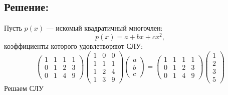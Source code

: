 \documentclass[12pt]{article}
\begin{document}
    \subsection*{Решение:}
    Пусть $p(x)$ --- искомый квадратичный многочлен:
    \[
        p(x) = a + b x + c x^2 ,
    \]
    коэффициенты которого удовлетворяют СЛУ:
    \[
        \begin{pmatrix}
            1 & 1 & 1 & 1 \\
            0 & 1 & 2 & 3 \\
            0 & 1 & 4 & 9
        \end{pmatrix}
        \begin{pmatrix}
            1 & 0 & 0 \\
            1 & 1 & 1 \\
            1 & 2 & 4 \\
            1 & 3 & 9
        \end{pmatrix}
        \begin{pmatrix}
            a \\
            b \\
            c
        \end{pmatrix}
        =
        \begin{pmatrix}
            1 & 1 & 1 & 1 \\
            0 & 1 & 2 & 3 \\
            0 & 1 & 4 & 9
        \end{pmatrix}
        \begin{pmatrix}
            1 \\
            2 \\
            3 \\
            5
        \end{pmatrix}
    \]
    Решаем СЛУ
\end{document}
